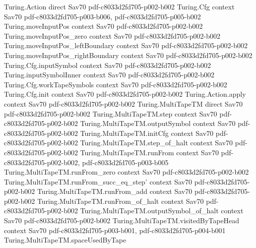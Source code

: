 \begin{theorem}
\label{Complexity.LogProg.SavitchARM.call_spec}
\leanok
\proofstep
  {Turing.Action}
  {direct}
  {Sav70}
  {pdf-c8033d2fd705-p002-b002}
\proofstep
  {Turing.Cfg}
  {context}
  {Sav70}
  {pdf-c8033d2fd705-p003-b006,
    pdf-c8033d2fd705-p005-b002}
\proofstep
  {Turing.moveInputPos}
  {context}
  {Sav70}
  {pdf-c8033d2fd705-p002-b002}
\proofstep
  {Turing.moveInputPos_zero}
  {context}
  {Sav70}
  {pdf-c8033d2fd705-p002-b002}
\proofstep
  {Turing.moveInputPos_leftBoundary}
  {context}
  {Sav70}
  {pdf-c8033d2fd705-p002-b002}
\proofstep
  {Turing.moveInputPos_rightBoundary}
  {context}
  {Sav70}
  {pdf-c8033d2fd705-p002-b002}
\proofstep
  {Turing.Cfg.inputSymbol}
  {context}
  {Sav70}
  {pdf-c8033d2fd705-p002-b002}
\proofstep
  {Turing.inputSymbolInner}
  {context}
  {Sav70}
  {pdf-c8033d2fd705-p002-b002}
\proofstep
  {Turing.Cfg.workTapeSymbols}
  {context}
  {Sav70}
  {pdf-c8033d2fd705-p002-b002}
\proofstep
  {Turing.Cfg.init}
  {context}
  {Sav70}
  {pdf-c8033d2fd705-p002-b002}
\proofstep
  {Turing.Action.apply}
  {context}
  {Sav70}
  {pdf-c8033d2fd705-p002-b002}
\proofstep
  {Turing.MultiTapeTM}
  {direct}
  {Sav70}
  {pdf-c8033d2fd705-p002-b002}
\proofstep
  {Turing.MultiTapeTM.step}
  {context}
  {Sav70}
  {pdf-c8033d2fd705-p002-b002}
\proofstep
  {Turing.MultiTapeTM.outputSymbol}
  {context}
  {Sav70}
  {pdf-c8033d2fd705-p002-b002}
\proofstep
  {Turing.MultiTapeTM.initCfg}
  {context}
  {Sav70}
  {pdf-c8033d2fd705-p002-b002}
\proofstep
  {Turing.MultiTapeTM.step_of_halt}
  {context}
  {Sav70}
  {pdf-c8033d2fd705-p002-b002}
\proofstep
  {Turing.MultiTapeTM.runFrom}
  {context}
  {Sav70}
  {pdf-c8033d2fd705-p002-b002,
    pdf-c8033d2fd705-p003-b005}
\proofstep
  {Turing.MultiTapeTM.runFrom_zero}
  {context}
  {Sav70}
  {pdf-c8033d2fd705-p002-b002}
\proofstep
  {Turing.MultiTapeTM.runFrom_succ_eq_step'}
  {context}
  {Sav70}
  {pdf-c8033d2fd705-p002-b002}
\proofstep
  {Turing.MultiTapeTM.runFrom_add}
  {context}
  {Sav70}
  {pdf-c8033d2fd705-p002-b002}
\proofstep
  {Turing.MultiTapeTM.runFrom_of_halt}
  {context}
  {Sav70}
  {pdf-c8033d2fd705-p002-b002}
\proofstep
  {Turing.MultiTapeTM.outputSymbol_of_halt}
  {context}
  {Sav70}
  {pdf-c8033d2fd705-p002-b002}
\proofstep
  {Turing.MultiTapeTM.visitedByTapeHead}
  {context}
  {Sav70}
  {pdf-c8033d2fd705-p003-b001,
    pdf-c8033d2fd705-p004-b001}
\proofstep
  {Turing.MultiTapeTM.spaceUsedByTape}

\end{theorem}
